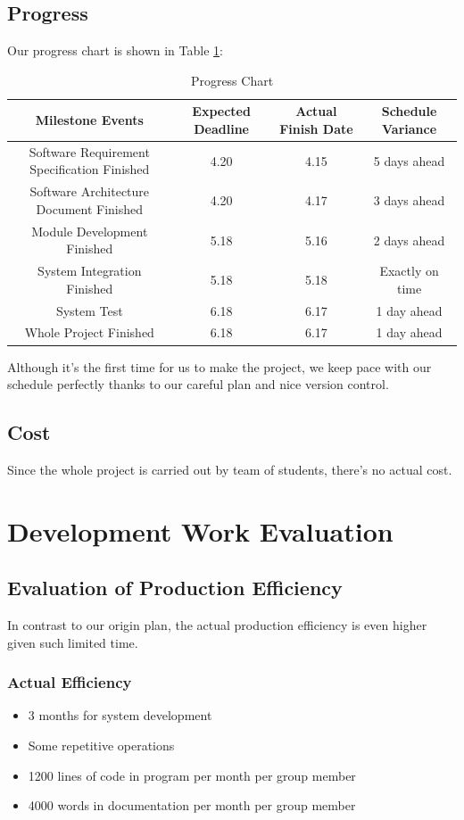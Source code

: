 \documentclass[10pt]{article}
\begin{document}
\subsection{Progress}
Our progress chart is shown in Table \ref{Progress Chart}:

\begin{table}[htb]
	\centering

	\begin{tabular}{|c|c|c|c|}
		\hline
		Milestone Events & Expected Deadline & Actual Finish Date & Schedule Variance\\
		\hline
		Software Requirement Specification Finished	& 4.20 & 4.15 & 5 days ahead \\
		\hline
		Software Architecture Document Finished	& 4.20 & 4.17 & 3 days ahead\\
		\hline
		Module Development Finished	&5.18	&5.16&	2 days ahead\\
		\hline
		System Integration Finished	&5.18	&5.18&	Exactly on time\\
		\hline
		System Test	&6.18	&6.17&	1 day ahead\\
		\hline
		Whole Project Finished	&6.18	&6.17&	1 day ahead \\
		\hline
		\end{tabular}

	\caption{Progress Chart}
	\label{Progress Chart}
\end{table}

Although it’s the first time for us to make the project, we keep pace with our schedule perfectly thanks to our careful plan and nice version control.

\subsection{Cost}
Since the whole project is carried out by team of students, there’s no actual cost.

\section{Development Work Evaluation}
\subsection{Evaluation of Production Efficiency}
In contrast to our origin plan, the actual production efficiency is even higher given such limited time.

\subsubsection{Actual Efficiency}
\begin{itemize}
	\item 3 months for system development
	\item Some repetitive operations
	\item 1200 lines of code in program per month per group member
	\item 4000 words in documentation per month per group member
	
\end{itemize}
\end{document}

